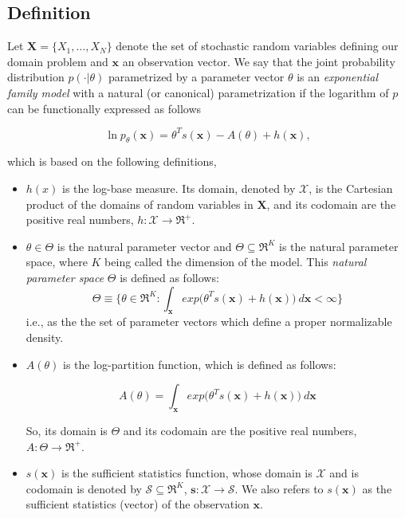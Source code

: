 \documentclass[11pt, oneside]{article}   	%
\newcommand{\bm}{\mathbf}
\numberwithin{figure}{section}
\numberwithin{equation}{section}
\numberwithin{table}{section}
\theoremstyle{definition}
\begin{document}
\subsection{Definition}

Let $\bm X = \{X_1,\ldots,X_N\}$ denote the set of stochastic random variables defining our domain problem and $\bm x$ an observation vector.  We say that the joint probability distribution $p(\cdot|\theta)$ parametrized by a parameter vector $\theta$ is an \textit{exponential family model} with a natural (or canonical) parametrization if the logarithm of $p$ can be functionally expressed as follows

\begin{equation}
\label{Equation:EFCanonical}
\ln p_\theta(\bm x) = \theta^T s(\bm x) - A(\theta) + h(\bm x),
\end{equation}

\noindent which is based on the following definitions,


\begin{itemize}
\item $h(x)$ is the log-base measure. Its domain, denoted by $\mathcal{X}$, is the Cartesian product of the domains of random variables in $\bm X$, and its codomain are the positive real numbers, $ h: \mathcal{X} \rightarrow \Re^+$.

\item $\theta\in \Theta$ is the natural parameter vector and $\Theta\subseteq \Re^K$ is the natural parameter space, where $K$ being called  the dimension of the model. This \emph{natural parameter space} $\Theta$ is defined as follows:
\begin{equation}
\label{Equation:NPS}
\Theta \equiv \{ \theta \in\Re^K: \int_{\bm x} exp\big(\theta^T s(\bm x) + h(\bm x) \big)~d\bm x < \infty \}
\end{equation}
\noindent i.e., as the the set of parameter vectors which define a proper normalizable density. 

\item $A(\theta)$ is the log-partition function, which is defined as follows:

$$ A(\theta) = \int_{\bm x} exp\big(\theta^T s(\bm x) + h(\bm x)\big)~d\bm x$$

So, its domain is $\Theta$ and its codomain are the positive real numbers, $ A: \Theta \rightarrow \Re^+$.

\item $s(\bm x)$ is the sufficient statistics function, whose domain is $\mathcal{X}$ and is codomain is denoted by $\mathcal{S}\subseteq \Re^K$, $\bm s : \mathcal{X}\rightarrow \mathcal{S}$. We also refers to $s(\bm x)$ as the sufficient statistics (vector) of the observation $\bm x$. 
\end{itemize}
\end{document}

